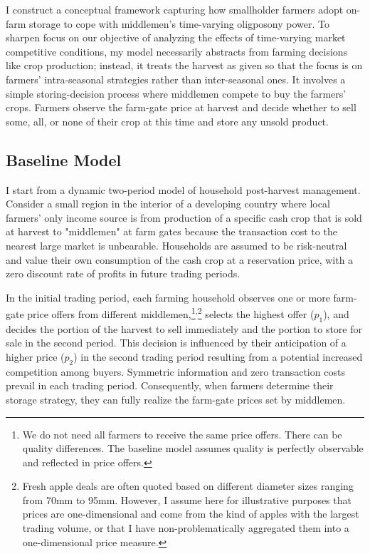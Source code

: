 \noindent I construct a conceptual framework capturing how smallholder farmers adopt on-farm storage to cope with middlemen's time-varying oligposony power. To sharpen focus on our objective of analyzing the effects of time-varying market competitive conditions, my model necessarily abstracts from farming decisions like crop production; instead, it treats the harvest as given so that the focus is on farmers' intra-seasonal strategies rather than inter-seasonal ones. It involves a simple storing-decision process where middlemen compete to buy the farmers' crops. Farmers observe the farm-gate price at harvest and decide whether to sell some, all, or none of their crop at this time and store any unsold product. 

\subsection{Baseline Model}
\noindent I start from a dynamic two-period model of household post-harvest management. Consider a small region in the interior of a developing country where local farmers' only income source is from production of a specific cash crop that is sold at harvest to "middlemen" at farm gates because the transaction cost to the nearest large market is unbearable. Households are assumed to be risk-neutral and value their own consumption of the cash crop at a reservation price, with a zero discount rate of profits in future trading periods. 


In the initial trading period, each farming household observes one or more farm-gate price offers from different middlemen,\footnote{We do not need all farmers to receive the same price offers. There can be quality differences. The baseline model assumes quality is perfectly observable and reflected in price offers.}\textsuperscript{,}\footnote{Fresh apple deals are often quoted based on different diameter sizes ranging from 70mm to 95mm. However, I assume here for illustrative purposes that prices are one-dimensional and come from the kind of apples with the largest trading volume, or that I have non-problematically aggregated them into a one-dimensional price measure.} selects the highest offer ($p_1$), and decides the portion of the harvest to sell immediately and the portion to store for sale in the second period. This decision is influenced by their anticipation of a higher price ($p_2$) in the second trading period resulting from a potential increased competition among buyers. Symmetric information and zero transaction costs prevail in each trading period. Consequently, when farmers determine their storage strategy, they can fully realize the farm-gate prices set by middlemen. 

